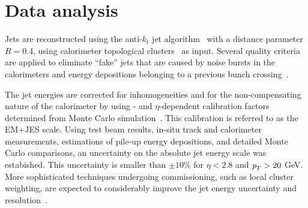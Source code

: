 \section{Data analysis}\label{sec:EventSelection}


Jets are reconstructed using the anti-$k_t$ jet algorithm~\cite{antiktalg} with a distance parameter $R = 0.4$, using calorimeter topological clusters~\cite{topoClusters} as input.  %
Several quality criteria are applied to eliminate ``fake'' jets that are %
caused by noise bursts in the calorimeters and energy depositions belonging to a previous bunch crossing~\cite{ATLAS-CONF-2012-020}.


The jet energies are corrected for inhomogeneities and for
the non-compensating nature of the calorimeter by using \pt- and $\eta$-dependent calibration factors determined from Monte Carlo simulation~\cite{JESnote}. This calibration is referred to as the EM+JES scale.
Using test beam results, in-situ track and calorimeter measurements, estimations of pile-up energy depositions, and detailed Monte Carlo comparisons, an uncertainty on the absolute jet energy scale was estabished. This uncertainty is smaller than $\pm 10\%$ for $\eta < 2.8$ and ${\emph{p}_{T}} > 20$ GeV. More sophisticated techniques undergoing commissioning, such as local cluster weighting, are expected to considerably improve the jet energy uncertainty and resolution~\cite{CSC}. 




